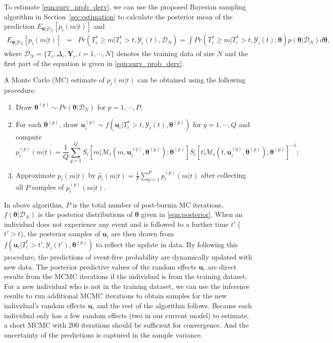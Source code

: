 \documentclass[Crown, sagev, times, doublespace]{sagej}
\begin{document}
To estimate \eqref{eqn:surv_prob_derv}, we can use the proposed Bayesian sampling algorithm in Section~\ref{sec:estimation} to calculate the posterior mean of the prediction $E_{\boldsymbol{\theta}|\mathcal{D}_N}[p_i(m|t)]$ and
\begin{eqnarray}\label{eqn:expct_pred}
\nonumber E_{\boldsymbol{\theta}|\mathcal{D}_N}[p_i(m|t)] & = & Pr(T_i^*\ge m|T_i^*>t, \mathcal{Y}_{i}(t), \mathcal{D}_N)=\int Pr(T_i^*\ge m|T_i^*>t, \mathcal{Y}_{i}(t);\boldsymbol{\theta})p(\boldsymbol{\theta}|\mathcal{D}_N)d\boldsymbol{\theta},
\end{eqnarray}
where $\mathcal{D}_N=\{T_i, \Delta_i, \boldsymbol{Y}_i, i=1, \cdots, N\}$ denotes the training data of size $N$ and the first part of the equation is given in \eqref{eqn:surv_prob_derv}.

A Monte Carlo (MC) estimate of $p_i(m|t)$ can be obtained using the following procedure:
\begin{enumerate}
\item Draw $\boldsymbol{\theta}^{(p)} \sim Pr(\boldsymbol{\theta}|\mathcal{D}_N)$ for $p=1, \cdots, P$;
\item For each $\boldsymbol{\theta}^{(p)}$, draw ${\boldsymbol u}^{(q)}_i\sim f({\boldsymbol u}_i|T_i^*>t, \mathcal{Y}_{i}(t), \boldsymbol{\theta}^{(p)})$ for $q=1, \cdots, Q$ and compute $$p_i^{(p)}(m|t)=\frac{1}{Q}\sum_{q=1}^QS_i[m|\mathcal{M}_{i}(m, {\boldsymbol u}^{(q)}_i, \boldsymbol{\theta}^{(p)});\boldsymbol{\theta}^{(p)}]S_i[t|\mathcal{M}_{i}(t, {\boldsymbol u}^{(q)}_i, \boldsymbol{\theta}^{(p)});\boldsymbol{\theta}^{(p)}]^{-1};$$
\item Approximate $p_i(m|t)$ by $\hat{p}_i(m|t)=\frac{1}{P}\sum_{p=1}^P p^{(p)}_i(m|t)$ after collecting all $P$ samples of $p_i^{(p)}(m|t)$.
\end{enumerate}

In above algorithm, $P$ is the total number of post-burnin MC iterations, $f(\boldsymbol{\theta}|\mathcal{D}_N)$ is the posterior distributions of $\boldsymbol{\theta}$ given in \eqref{eqn:posterior}. When an individual does not experience any event and is followed to a further time $t'$ ($t' > t$), the posterior samples of ${\boldsymbol u}_i$ are then drawn from $f({\boldsymbol u}_i|T_i^*>t', \mathcal{Y}_{i}(t'), \boldsymbol{\theta}^{(p)})$ to reflect the update in data. By following this procedure, the predictions of event-free probability are dynamically updated with new data. The posterior predictive values of the random effects ${\boldsymbol u}_i$ are direct results from the MCMC iterations if the individual is from the training dataset. For a new individual who is not in the training dataset, we can use the inference results to run additional MCMC iterations to obtain samples for the new individual's random effects ${\boldsymbol u}_i$ and the rest of the algorithm follows. Because each individual only has a few random effects (two in our current model) to estimate, a short MCMC with 200 iterations should be sufficient for convergence.\citep{taylor2013real} And the uncertainty of the predictions is captured in the sample variance.
\end{document}
